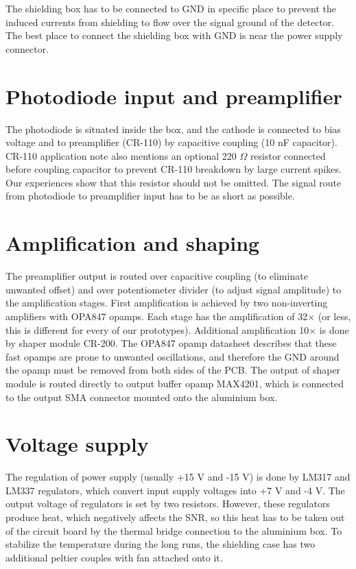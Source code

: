 \par
The shielding box has to be connected to GND in specific place to prevent the induced currents from shielding to flow over the signal ground of the detector. The best place to connect the shielding box with GND is near the power supply connector.


\section{Photodiode input and preamplifier}
The photodiode is situated inside the box, and the cathode is connected to bias voltage and to preamplifier (CR-110) by capacitive coupling (10 nF capacitor). CR-110 application note also mentions an optional 220 $\Omega$ resistor connected before coupling capacitor to prevent CR-110 breakdown by large current spikes. Our experiences show that this resistor should not be omitted. The signal route from photodiode to preamplifier input has to be as short as possible. 

\section{Amplification and shaping}
The preamplifier output is routed over capacitive coupling (to eliminate unwanted offset) and over potentiometer divider (to adjust signal amplitude) to the amplification stages. First amplification is achieved by two non-inverting amplifiers with OPA847 opamps. Each stage has the amplification of 32$\times$ (or less, this is different for every of our prototypes). Additional amplification 10$\times$ is done by shaper module CR-200. The OPA847 opamp datasheet \cite{OPA847} describes that these fast opamps are prone to unwanted oscillations, and therefore the GND around the opamp must be removed from both sides of the PCB. The output of shaper module is routed directly to output buffer opamp MAX4201, which is connected to the output SMA connector mounted onto the aluminium box.


\section{Voltage supply}
The regulation of power supply (usually +15 V and -15 V) is done by LM317 and LM337 regulators, which convert input supply voltages into +7 V and -4 V. The output voltage of regulators is set by two resistors. However, these regulators produce heat, which negatively affects the SNR, so this heat has to be taken out of the circuit board by the thermal bridge connection to the aluminium box. To stabilize the temperature during the long runs, the shielding case has two additional peltier couples with fan attached onto it.

